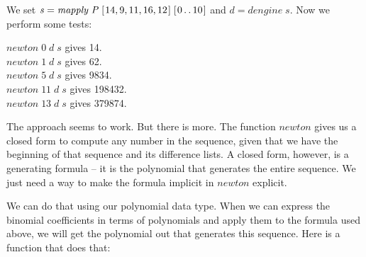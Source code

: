\documentclass[tikz]{scrreprt}
\newcommand{\Conid}[1]{\mathit{#1}}
\newcommand{\Varid}[1]{\mathit{#1}}
\begin{document}
We set \ensuremath{\Varid{s}\mathrel{=}\Varid{mapply}\;\Conid{P}\;[\mskip1.5mu \mathrm{14},\mathrm{9},\mathrm{11},\mathrm{16},\mathrm{12}\mskip1.5mu]\;[\mskip1.5mu \mathrm{0}\mathinner{\ldotp\ldotp}\mathrm{10}\mskip1.5mu]} and \ensuremath{\Varid{d}\mathrel{=}\Varid{dengine}\;\Varid{s}}.
Now we perform some tests:

\begin{minipage}{\textwidth}
\ensuremath{\Varid{newton}\;\mathrm{0}\;\Varid{d}\;\Varid{s}} gives      14.\\
\ensuremath{\Varid{newton}\;\mathrm{1}\;\Varid{d}\;\Varid{s}} gives      62.\\
\ensuremath{\Varid{newton}\;\mathrm{5}\;\Varid{d}\;\Varid{s}} gives    9834.\\
\ensuremath{\Varid{newton}\;\mathrm{11}\;\Varid{d}\;\Varid{s}} gives  198432.\\
\ensuremath{\Varid{newton}\;\mathrm{13}\;\Varid{d}\;\Varid{s}} gives  379874.
\end{minipage}

The approach seems to work.
But there is more.
The function \ensuremath{\Varid{newton}} gives us a closed form 
to compute any number in the sequence,
given that we have the beginning of that sequence
and its difference lists.
A closed form, however, is a generating formula --
it is the polynomial that generates the entire sequence.
We just need a way to make the formula implicit in
\ensuremath{\Varid{newton}} explicit.

We can do that using our polynomial data type.
When we can express the binomial coefficients
in terms of polynomials and apply them
to the formula used above, we will get the polynomial out
that generates this sequence.
Here is a function that does that:
\end{document}
